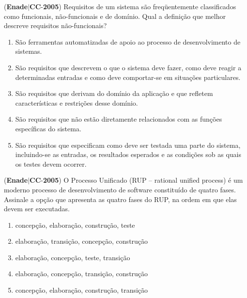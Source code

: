 \documentclass{exam}
\begin{document}
\begin{questions}
\question (\textbf{Enade}$|$\textbf{CC}-\textbf{2005}) Requisitos de um sistema são freqüentemente classificados como
funcionais, não-funcionais e de domínio. Qual a definição que
melhor descreve requisitos não-funcionais?
	\begin{enumerate}[label=\alph*)]
		\item  São ferramentas automatizadas de apoio ao processo de
desenvolvimento de sistemas.
		\item  São requisitos que descrevem o que o sistema deve fazer, como
deve reagir a determinadas entradas e como deve comportar-se
em situações particulares.
		\item  São requisitos que derivam do domínio da aplicação e que
refletem características e restrições desse domínio.
		\item  São requisitos que não estão diretamente relacionados com as
funções específicas do sistema.
		\item  São requisitos que especificam como deve ser testada uma parte
do sistema, incluindo-se as entradas, os resultados esperados e as
condições sob as quais os testes devem ocorrer.

	\end{enumerate}

\question (\textbf{Enade}$|$\textbf{CC}-\textbf{2005}) O Processo Unificado (RUP – rational unified process) é um
moderno processo de desenvolvimento de software constituído de
quatro fases. Assinale a opção que apresenta as quatro fases do RUP,
na ordem em que elas devem ser executadas.
	\begin{enumerate}[label=\alph*)]
		\item  concepção, elaboração, construção, teste
		\item  elaboração, transição, concepção, construção
		\item  elaboração, concepção, teste, transição
		\item  elaboração, concepção, transição, construção
		\item  concepção, elaboração, construção, transição

	\end{enumerate}


\end{questions}
\end{document}
